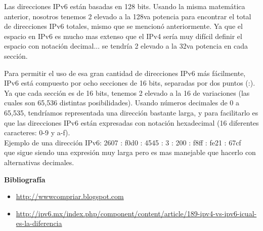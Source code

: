 \documentclass[11pt, a4paper]{report}
\begin{document}
Las direcciones IPv6 están basadas en 128 bits. Usando la misma matemática
anterior, nosotros tenemos 2 elevado a la 128va potencia para encontrar el
total de direcciones IPv6 totales, mismo que se mencionó anteriormente. Ya que
el espacio en IPv6 es mucho mas extenso que el IPv4 sería muy difícil definir
el espacio con notación decimal... se tendría 2 elevado a la 32va potencia en
cada sección.

Para permitir el uso de esa gran cantidad de direcciones IPv6 más fácilmente,
IPv6 está compuesto por ocho secciones de 16 bits, separadas por dos puntos
(:). Ya que cada sección es de 16 bits, tenemos 2 elevado a la 16 de
variaciones (las cuales son 65,536 distintas posibilidades). Usando números
decimales de 0 a 65,535, tendríamos representada una dirección bastante larga,
y para facilitarlo es que las direcciones IPv6 están expresadas con notación
hexadecimal (16 diferentes caracteres: 0-9 y a-f). \\

Ejemplo de una dirección IPv6: 2607 : f0d0 : 4545 : 3 : 200 : f8ff : fe21 : 67cf
\\

que sigue siendo una expresión muy larga pero es mas manejable que hacerlo con
alternativas decimales.



\newpage

\textbf{Bibliografía} \\

\begin{itemize}

\item \url{http://wwwcompriar.blogspot.com}
\item \url{http://ipv6.mx/index.php/component/content/article/189-ipv4-vs-ipv6-icual-es-la-diferencia}
\end{itemize}
\end{document}
